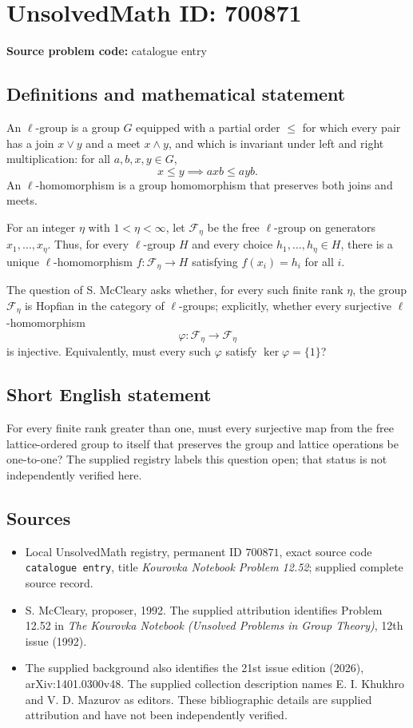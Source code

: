 \documentclass[11pt]{article}
\begin{document}
\section*{UnsolvedMath ID: 700871}
\textbf{Source problem code:} catalogue entry
\subsection{Definitions and mathematical statement}
An \(\ell\)-group is a group \(G\) equipped with a partial order \(\leq\) for which every pair has a join \(x\vee y\) and a meet \(x\wedge y\), and which is invariant under left and right multiplication: for all \(a,b,x,y\in G\),
\[
x\leq y\implies axb\leq ayb.
\]
An \(\ell\)-homomorphism is a group homomorphism that preserves both joins and meets.

For an integer \(\eta\) with \(1<\eta<\infty\), let \(\mathcal F_{\eta}\) be the free \(\ell\)-group on generators \(x_1,\ldots,x_{\eta}\). Thus, for every \(\ell\)-group \(H\) and every choice \(h_1,\ldots,h_{\eta}\in H\), there is a unique \(\ell\)-homomorphism \(f:\mathcal F_{\eta}\to H\) satisfying \(f(x_i)=h_i\) for all \(i\).

The question of S. McCleary asks whether, for every such finite rank \(\eta\), the group \(\mathcal F_{\eta}\) is Hopfian in the category of \(\ell\)-groups; explicitly, whether every surjective \(\ell\)-homomorphism
\[
\varphi:\mathcal F_{\eta}\longrightarrow\mathcal F_{\eta}
\]
is injective. Equivalently, must every such \(\varphi\) satisfy \(\ker\varphi=\{1\}\)?
\subsection{Short English statement}
For every finite rank greater than one, must every surjective map from the free lattice-ordered group to itself that preserves the group and lattice operations be one-to-one? The supplied registry labels this question open; that status is not independently verified here.
\subsection{Sources}
\begin{itemize}
\item Local UnsolvedMath registry, permanent ID \(700871\), exact source code \texttt{catalogue entry}, title \emph{Kourovka Notebook Problem 12.52}; supplied complete source record.
\item S. McCleary, proposer, 1992. The supplied attribution identifies Problem 12.52 in \emph{The Kourovka Notebook (Unsolved Problems in Group Theory)}, 12th issue (1992).
\item The supplied background also identifies the 21st issue edition (2026), arXiv:1401.0300v48. The supplied collection description names E. I. Khukhro and V. D. Mazurov as editors. These bibliographic details are supplied attribution and have not been independently verified.
\end{itemize}
\end{document}
